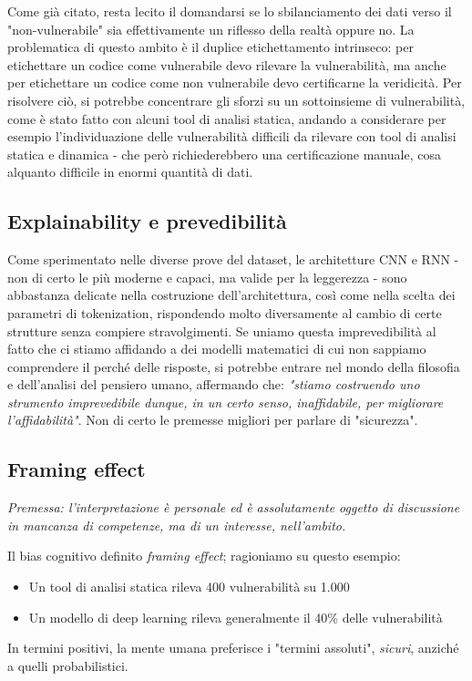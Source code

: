 \documentclass[conference]{IEEEtran}
\begin{document}
Come già citato, resta lecito il domandarsi se lo sbilanciamento dei dati verso il "non-vulnerabile" sia effettivamente un riflesso della realtà oppure no. La problematica di questo ambito è il duplice etichettamento intrinseco: per etichettare un codice come vulnerabile devo rilevare la vulnerabilità, ma anche per etichettare un codice come non vulnerabile devo certificarne la veridicità. Per risolvere ciò, si potrebbe concentrare gli sforzi su un sottoinsieme di vulnerabilità, come è stato fatto con alcuni tool di analisi statica, andando a considerare per esempio l'individuazione delle vulnerabilità difficili da rilevare con tool di analisi statica e dinamica - che però richiederebbero una certificazione manuale, cosa alquanto difficile in enormi quantità di dati.

\subsection{Explainability e prevedibilità}

Come sperimentato nelle diverse prove del dataset, le architetture CNN e RNN - non di certo le più moderne e capaci, ma valide per la leggerezza - sono abbastanza delicate nella costruzione dell'architettura, così come nella scelta dei parametri di tokenization, rispondendo molto diversamente al cambio di certe strutture senza compiere stravolgimenti. Se uniamo questa imprevedibilità al fatto che ci stiamo affidando a dei modelli matematici di cui non sappiamo comprendere il perché delle risposte, si potrebbe entrare nel mondo della filosofia e dell'analisi del pensiero umano, affermando che: \textit{"stiamo costruendo uno strumento imprevedibile dunque, in un certo senso, inaffidabile, per migliorare l'affidabilità"}. Non di certo le premesse migliori per parlare di "sicurezza".

\subsection{Framing effect}
\textit{Premessa: l'interpretazione è personale ed è assolutamente oggetto di discussione in mancanza di competenze, ma di un interesse, nell'ambito.}

Il bias cognitivo definito \textit{framing effect}; ragioniamo su questo esempio:
\begin{itemize}
    \item Un tool di analisi statica rileva 400 vulnerabilità su 1.000
    \item Un modello di deep learning rileva generalmente il 40\% delle vulnerabilità
\end{itemize}
%
In termini positivi, la mente umana preferisce i "termini assoluti", \textit{sicuri}, anziché a quelli probabilistici. 
\end{document}
